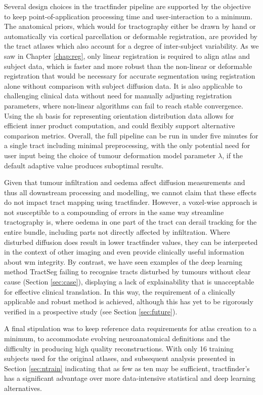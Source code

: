 Several design choices in the tractfinder pipeline are supported by the objective to keep point-of-application processing time and user-interaction to a minimum.
The anatomical priors, which would for tractography either be drawn by hand or automatically via cortical parcellation or deformable registration, are provided by the tract atlases which also account for a degree of inter-subject variability.
As we saw in Chapter \ref{chap:reg}, only linear registration is required to align atlas and subject data, which is faster and more robust than the non-linear or deformable registration that would be necessary for accurate segmentation using registration alone without comparison with subject diffusion data.
It is also applicable to challenging clinical data without need for manually adjusting registration parameters, where non-linear algorithms can fail to reach stable convergence.
Using the \gls{sh} basis for representing orientation distribution data allows for efficient inner product computation, and could flexibly support alternative comparison metrics.
Overall, the full pipeline can be run in under five minutes for a single tract including minimal preprocessing, with the only potential need for user input being the choice of tumour deformation model parameter $\lambda$, if the default adaptive value produces suboptimal results.

Given that tumour infiltration and oedema affect diffusion measurements and thus all downstream processing and modelling, we cannot claim that these effects do not impact tract mapping using tractfinder.
However, a voxel-wise approach is not susceptible to a compounding of errors in the same way streamline tractography is, where oedema in one part of the tract can derail tracking for the entire bundle, including parts not directly affected by infiltration.
Where disturbed diffusion does result in lower tractfinder values, they can be interpreted in the context of other imaging and even provide clinically useful information about \gls{wm} integrity.
By contrast, we have seen examples of the deep learning method TractSeg failing to recognise tracts disturbed by tumours without clear cause (Section \ref{sec:case}), displaying a lack of explainability that is unacceptable for effective clinical translation.
In this way, the requirement of a clinically applicable and robust method is achieved, although this has yet to be rigorously verified in a prospective study (see Section \ref{sec:future}).

A final stipulation was to keep reference data requirements for atlas creation to a minimum, to accommodate evolving neuroanatomical definitions and the difficulty in producing high quality reconstructions.
With only 16 training subjects used for the original atlases, and subsequent analysis presented in Section \ref{sec:ntrain} indicating that as few as ten may be sufficient, tractfinder's has a significant advantage over more data-intensive statistical and deep learning alternatives.

